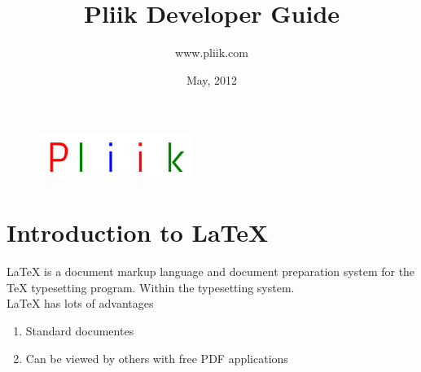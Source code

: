\documentclass[10pt,letterpaper,titlepage]{article}
\author{www.pliik.com}
\title{Pliik Developer Guide}
\date{May, 2012}
\begin{document}
\begin{figure}
\begin{center}
\includegraphics[width=50mm]{logo.png}
\end{center}
\end{figure}
\maketitle{}

\newpage

\section{Introduction to LaTeX}
LaTeX is a document markup language and document preparation system for the TeX typesetting program. Within the typesetting system.\\

LaTeX{} has lots of advantages

\begin{enumerate}
\item Standard documentes
\item Can be viewed by others with free PDF applications
\end{enumerate}
\end{document}

